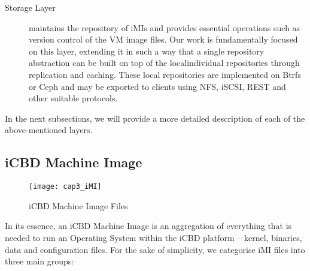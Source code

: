 \begin{description}
	\item [Storage Layer] maintains the repository of iMIs and provides essential operations such as version control of the VM image files. Our work is fundamentally focused on this layer, extending it in such a way that a single repository abstraction can be built on top of the local\/individual repositories through replication and caching. These local repositories are implemented on Btrfs or Ceph and may be exported to clients using \acrshort{NFS}, \acrshort{iSCSI}, REST and other suitable protocols.
	
\end{description}
 
In the next subsections, we will provide a more detailed description of each of the above-mentioned layers.

\subsection{iCBD Machine Image}
\label{sub:icbd_imi}

\begin{figure}[htbp]
	\centering
	\texttt{[image: cap3\_iMI]}
	\caption{iCBD Machine Image Files}
	\label{fig:icbd_iMI_files}
\end{figure}

In its essence, an iCBD Machine Image is an aggregation of everything that is needed to run an Operating System within the iCBD platform – kernel, binaries, data and configuration files. For the sake of simplicity, we categorise iMI files into three main groups:

